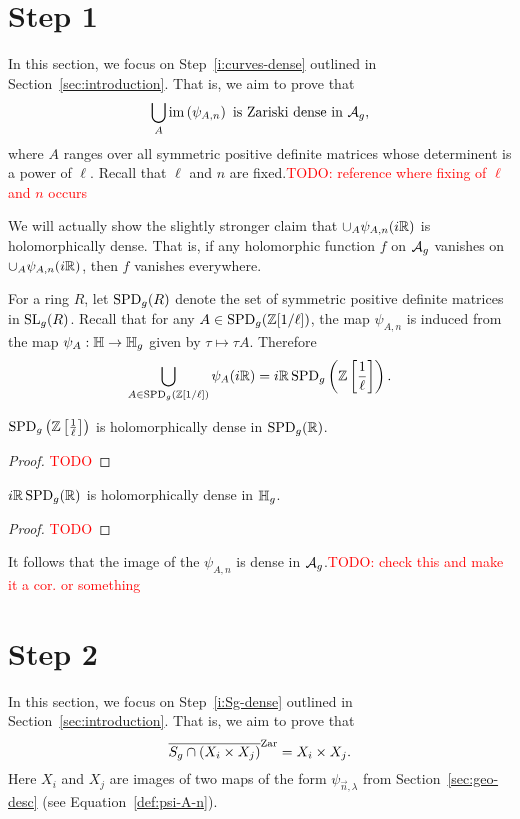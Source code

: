 \documentclass{amsart}
\begin{document}
\newpage

\section{Step 1}
\label{sec:step-1}

In this section, we focus on Step~\ref{i:curves-dense} outlined in Section~\ref{sec:introduction}. That is, we aim to prove that
\[
  \bigcup_{A} \operatorname{im}\left(\psi_{A,n}\right) \text{ is Zariski dense in } \mathcal{A}_g,
\]
where $A$ ranges over all symmetric positive definite matrices whose determinent is a power of $\ell$. Recall that $\ell$ and $n$ are fixed.\textcolor{red}{TODO: reference where fixing of $\ell$ and $n$ occurs}

We will actually show the slightly stronger claim that $\cup_{A} \psi_{A,n}(i\mathbb{R})$ is holomorphically dense. That is, if any holomorphic function $f$ on $\mathcal{A}_g$ vanishes on $\cup_{A} \psi_{A,n}(i\mathbb{R})$, then $f$ vanishes everywhere.

For a ring $R$, let $\operatorname{SPD}_g(R)$ denote the set of symmetric positive definite matrices in $\operatorname{SL}_g(R)$. Recall that for any $A \in \operatorname{SPD}_g(\mathbb{Z}[1/\ell])$, the map $\psi_{A,n}$ is induced from the map $\psi_A: \mathbb{H} \to \mathbb{H}_g$ given by $\tau \mapsto \tau A$. Therefore
\[
  \bigcup_{A \in \operatorname{SPD}_g(\mathbb{Z}[1/\ell])} \psi_A(i\mathbb{R}) = i\mathbb{R}\operatorname{SPD}_g\left(\mathbb{Z}\left[\frac{1}{\ell}\right]\right).
\]

\begin{lemma}
  $\operatorname{SPD}_g\left(\mathbb{Z}\left[\frac{1}{\ell}\right]\right)$ is holomorphically dense in $\operatorname{SPD}_g(\mathbb{R})$.
\end{lemma}
\begin{proof}
  \textcolor{red}{TODO}
\end{proof}

\begin{lemma}
  $i\mathbb{R}\operatorname{SPD}_g(\mathbb{R})$ is holomorphically dense in $\mathbb{H}_g$.
\end{lemma}
\begin{proof}
  \textcolor{red}{TODO}
\end{proof}

It follows that the image of the $\psi_{A,n}$ is dense in $\mathcal{A}_g$.\textcolor{red}{TODO: check this and make it a cor. or something}

\section{Step 2}
\label{sec:step-2}

In this section, we focus on Step~\ref{i:Sg-dense} outlined in Section~\ref{sec:introduction}. That is, we aim to prove that
\[
  \overline{S_g \cap (X_i \times X_j)}^\mathrm{Zar} = X_i \times X_j.
\]
Here $X_i$ and $X_j$ are images of two maps of the form $\psi_{\vec{n},\lambda}$ from Section~\ref{sec:geo-desc} (see Equation~\ref{def:psi-A-n}).
\end{document}
